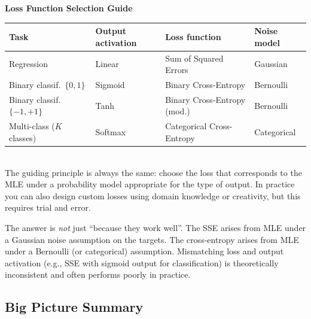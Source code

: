 \documentclass[11pt,a4paper]{article}
\begin{document}
\begin{tcolorbox}[colback=LightBlue,colframe=AccentBlue,boxrule=0.8pt,arc=3pt]
\textbf{Loss Function Selection Guide}\\[6pt]
\begin{tabular}{@{}llll@{}}
\toprule
\textbf{Task} & \textbf{Output activation} & \textbf{Loss function} & \textbf{Noise model} \\
\midrule
Regression & Linear & Sum of Squared Errors & Gaussian \\
Binary classif.\ $\{0,1\}$ & Sigmoid & Binary Cross-Entropy & Bernoulli \\
Binary classif.\ $\{-1,+1\}$ & Tanh & Binary Cross-Entropy (mod.) & Bernoulli \\
Multi-class ($K$ classes) & Softmax & Categorical Cross-Entropy & Categorical \\
\bottomrule
\end{tabular}\\[6pt]
The guiding principle is always the same: choose the loss that corresponds to the MLE under a probability model appropriate for the type of output. In practice you can also design custom losses using domain knowledge or creativity, but this requires trial and error.
\end{tcolorbox}

\begin{warnbox}
The answer is \emph{not} just ``because they work well''. The SSE arises from MLE under a Gaussian noise assumption on the targets. The cross-entropy arises from MLE under a Bernoulli (or categorical) assumption. Mismatching loss and output activation (e.g., SSE with sigmoid output for classification) is theoretically inconsistent and often performs poorly in practice.
\end{warnbox}

\subsection{Big Picture Summary}
\label{sec:bigpicture}
\end{document}
